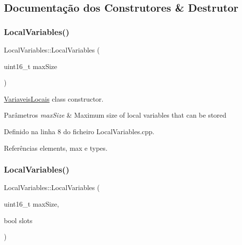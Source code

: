 \subsection{Documentação dos Construtores \& Destrutor}
\mbox{\label{classLocalVariables_ae354d02f996f4f584fe857d9304161c1}} 
\subsubsection{\texorpdfstring{Local\+Variables()}{LocalVariables()}\hspace{0.1cm}{\footnotesize\ttfamily [1/2]}}
{\footnotesize\ttfamily Local\+Variables\+::\+Local\+Variables (\begin{DoxyParamCaption}\item[{uint16\+\_\+t}]{max\+Size }\end{DoxyParamCaption})}



\hyperlink{classVariaveisLocais}{Variaveis\+Locais} class constructor. 


\begin{DoxyParams}{Parâmetros}
{\em max\+Size} & Maximum size of local variables that can be stored \\
\hline
\end{DoxyParams}


Definido na linha 8 do ficheiro Local\+Variables.\+cpp.



Referências elements, max e types.

\mbox{\label{classLocalVariables_a2c9e8aefc8aa8ff0d0efd305ab3e424b}} 
\subsubsection{\texorpdfstring{Local\+Variables()}{LocalVariables()}\hspace{0.1cm}{\footnotesize\ttfamily [2/2]}}
{\footnotesize\ttfamily Local\+Variables\+::\+Local\+Variables (\begin{DoxyParamCaption}\item[{uint16\+\_\+t}]{max\+Size,  }\item[{bool}]{slots }\end{DoxyParamCaption})}



